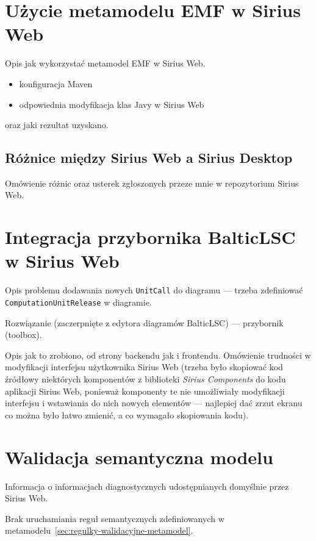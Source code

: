 \section{Użycie metamodelu EMF w Sirius Web}

Opis jak wykorzystać metamodel EMF w Sirius Web.

\begin{itemize}
	\item konfiguracja Maven
	\item odpowiednia modyfikacja klas Javy w Sirius Web
\end{itemize}

\noindent oraz jaki rezultat uzyskano.

\subsection{Różnice między Sirius Web a Sirius Desktop}

Omówienie różnic oraz usterek zgłoszonych przeze mnie w repozytorium Sirius
Web.

\section{Integracja przybornika BalticLSC w Sirius Web}

Opis problemu dodawania nowych \texttt{UnitCall} do diagramu --- trzeba
zdefiniować \texttt{ComputationUnitRelease} w diagramie.

Rozwiązanie (zaczerpnięte z edytora diagramów BalticLSC) --- przybornik
(toolbox).

Opis jak to zrobiono, od strony backendu jak i frontendu. Omówienie trudności w
modyfikacji interfejsu użytkownika Sirius Web (trzeba było skopiować kod
źródłowy niektórych komponentów z biblioteki \textit{Sirius Components} do kodu
aplikacji Sirius Web, ponieważ komponenty te nie umożliwiały modyfikacji
interfejsu i wstawiania do nich nowych elementów --- najlepiej dać zrzut ekranu
co można było łatwo zmienić, a co wymagało skopiowania kodu).

\section{Walidacja semantyczna modelu}

Informacja o informacjach diagnostycznych udostępnianych domyślnie przez Sirius
Web.

Brak uruchamiania reguł semantycznych zdefiniowanych w
metamodelu~\ref{sec:regulky-walidacyjne-metamodel}.

